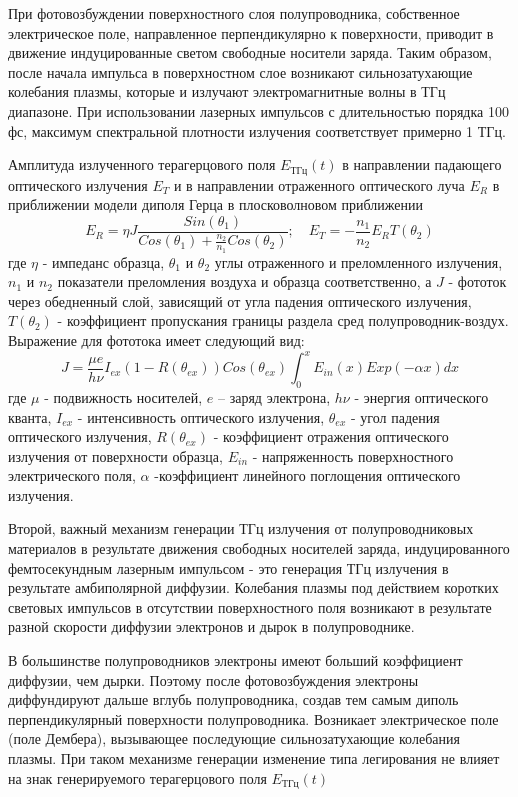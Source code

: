 \documentclass[a4paper,14pt,russian]{extreport}
\begin{document}
				При фотовозбуждении поверхностного слоя полупроводника, собственное электрическое поле, направленное перпендикулярно к поверхности, приводит в движение индуцированные светом свободные носители заряда. Таким образом, после начала импульса в поверхностном слое возникают сильнозатухающие колебания плазмы, которые и излучают электромагнитные волны в ТГц диапазоне. При использовании лазерных импульсов с длительностью порядка 100 фс, максимум спектральной плотности излучения соответствует примерно 1 ТГц.\par
				Амплитуда излученного терагерцового поля $E_{\text{ТГц}}(t)$ в направлении падающего оптического излучения $E_T$ и в направлении отраженного оптического луча $E_R$ в приближении модели диполя Герца в плосковолновом приближении
				\begin{equation}\label{THzAmplitude}
					E_R = \eta J \frac{Sin(\theta_1)}{Cos(\theta_1)+\frac{n_2}{n_1}Cos(\theta_2)}; \quad
					E_T = -\frac{n_1}{n_2}E_R T(\theta_2)
				\end{equation}
				где $\eta$ - импеданс образца, $\theta_1$ и $\theta_2$ углы отраженного и преломленного излучения, $n_1$ и $n_2$ показатели преломления воздуха и образца соответственно, а $J$ - фототок через обедненный слой, зависящий от угла падения оптического излучения, $T(\theta_2)$ - коэффициент пропускания границы раздела сред полупроводник-воздух. Выражение для фототока имеет следующий вид:
				\begin{equation}
					J = \frac{\mu e}{h \nu} I_{ex}(1-R(\theta_{ex}))Cos(\theta_{ex})\int_0^{x}E_{in}(x)Exp(-\alpha x)dx
				\end{equation}
				где $\mu$ - подвижность носителей, $e$ – заряд электрона, $h \nu$ - энергия оптического
кванта, $I_{ex}$ - интенсивность оптического излучения, $\theta_{ex}$ - угол падения оптического излучения, $R(\theta_{ex})$ - коэффициент отражения оптического излучения от поверхности образца, $E_{in}$ - напряженность поверхностного электрического поля, $\alpha$ -коэффициент линейного поглощения оптического излучения.\par
				Второй, важный механизм генерации ТГц излучения от полупроводниковых материалов в результате движения свободных носителей заряда, индуцированного фемтосекундным лазерным импульсом - это генерация ТГц излучения в результате амбиполярной диффузии. Колебания плазмы под действием коротких световых импульсов в отсутствии
поверхностного поля возникают в результате разной скорости диффузии электронов и дырок в полупроводнике.\par
				В большинстве полупроводников электроны имеют больший коэффициент диффузии, чем дырки. Поэтому после	фотовозбуждения электроны диффундируют дальше вглубь полупроводника, создав тем самым диполь перпендикулярный поверхности полупроводника. Возникает электрическое поле (поле Дембера), вызывающее последующие сильнозатухающие колебания плазмы. При таком механизме генерации изменение типа легирования не влияет на знак генерируемого терагерцового поля $E_{\text{ТГц}}(t)$
\end{document}
